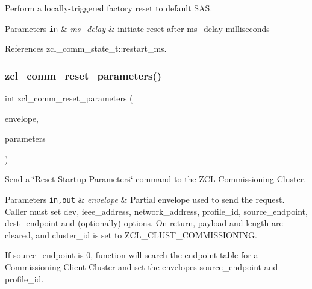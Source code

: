 Perform a locally-\/triggered factory reset to default S\+AS. 


\begin{DoxyParams}[1]{Parameters}
\mbox{\tt in}  & {\em ms\+\_\+delay} & initiate reset after {\ttfamily ms\+\_\+delay} milliseconds \\
\hline
\end{DoxyParams}


References zcl\+\_\+comm\+\_\+state\+\_\+t\+::restart\+\_\+ms.

\mbox{\label{group__zcl__commissioning_ga3d73d7ef453da4940c923d7d7663f8d9}} 
\subsubsection{\texorpdfstring{zcl\+\_\+comm\+\_\+reset\+\_\+parameters()}{zcl\_comm\_reset\_parameters()}}
{\footnotesize\ttfamily int zcl\+\_\+comm\+\_\+reset\+\_\+parameters (\begin{DoxyParamCaption}\item[{\hyperlink{structwpan__envelope__t}{wpan\+\_\+envelope\+\_\+t} \hyperlink{group__hal_gaef060b3456fdcc093a7210a762d5f2ed}{F\+AR} $\ast$}]{envelope,  }\item[{const zcl\+\_\+comm\+\_\+reset\+\_\+startup\+\_\+param\+\_\+t $\ast$}]{parameters }\end{DoxyParamCaption})}



Send a \char`\"{}\+Reset Startup Parameters\char`\"{} command to the Z\+CL Commissioning Cluster. 


\begin{DoxyParams}[1]{Parameters}
\mbox{\tt in,out}  & {\em envelope} & Partial envelope used to send the request. Caller must set {\ttfamily dev}, {\ttfamily ieee\+\_\+address}, {\ttfamily network\+\_\+address}, {\ttfamily profile\+\_\+id}, {\ttfamily source\+\_\+endpoint}, {\ttfamily dest\+\_\+endpoint} and (optionally) {\ttfamily options}. On return, {\ttfamily payload} and {\ttfamily length} are cleared, and {\ttfamily cluster\+\_\+id} is set to Z\+C\+L\+\_\+\+C\+L\+U\+S\+T\+\_\+\+C\+O\+M\+M\+I\+S\+S\+I\+O\+N\+I\+NG.\\
\hline
\end{DoxyParams}
If {\ttfamily source\+\_\+endpoint} is 0, function will search the endpoint table for a Commissioning Client Cluster and set the envelope\textquotesingle{}s {\ttfamily source\+\_\+endpoint} and {\ttfamily profile\+\_\+id}.


